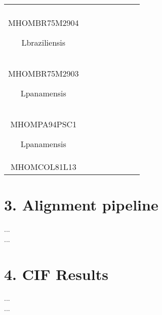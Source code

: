 \documentclass[table,
12pt, %
a4paper, %
oneside, %
headinclude,footinclude, %
BCOR5mm, %
]{scrartcl}
\begin{document}
\begin{table}[hbt]
\begin{adjustbox}{width=\columnwidth,center}
\begin{tabular}{|c|c|c|c|c|c|c|c|}
{\begin{enumerate}
          \item Lbraziliensis\\MHOMBR75M2904
          \item Lbraziliensis\\MHOMBR75M2903
          \item Lpanamensis\\MHOMPA94PSC1
          \item Lpanamensis\\MHOMCOL81L13
        \end{enumerate}} \\
      \bottomrule
    \end{tabular}
    \label{table:Genomeclusters1}
  \end{adjustbox}
\end{table}

\newpage

\section{3. Alignment pipeline}
...\\
...

\section{4. CIF Results}

...\\
...


\newpage
\
\renewcommand{\refname}{\spacedlowsmallcaps{References}} %




\end{document}
